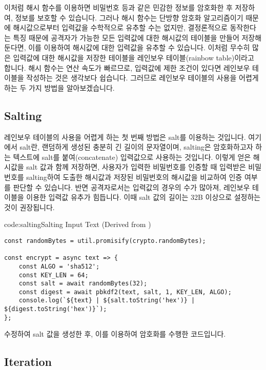 이처럼 해시 함수를 이용하면 비밀번호 등과 같은 민감한 정보를 암호화한 후 저장하여, 정보를 보호할 수 있습니다. 그러나 해시 함수는 단방향 암호화 알고리즘이기 때문에 해시값으로부터 입력값을 수학적으로 유추할 수는 없지만, 결정론적으로 동작한다는 특징 때문에 공격자가 가능한 모든 입력값에 대한 해시값의 테이블을 만들어 저장해둔다면, 이를 이용하여 해시값에 대한 입력값을 유추할 수 있습니다. 이처럼 무수히 많은 입력값에 대한 해시값을 저장한 테이블을 레인보우 테이블(rainbow table)이라고 합니다. 해시 함수는 연산 속도가 빠르므로, 입력값에 제한 조건이 있다면 레인보우 테이블을 작성하는 것은 생각보다 쉽습니다. 그러므로 레인보우 테이블의 사용을 어렵게 하는 두 가지 방법을 알아보겠습니다.

\subsection*{Salting}

레인보우 테이블의 사용을 어렵게 하는 첫 번째 방법은 salt를 이용하는 것입니다. 여기에서 salt란, 랜덤하게 생성된 충분히 긴 길이의 문자열이며, salting은 암호화하고자 하는 텍스트에 salt를 붙여(concatenate) 입력값으로 사용하는 것입니다. 이렇게 얻은 해시값을 salt 값과 함께 저장하면, 사용자가 입력한 비밀번호를 인증할 때 입력받은 비밀번호를 salting하여 도출한 해시값과 저장된 비밀번호의 해시값을 비교하여 인증 여부를 판단할 수 있습니다. 반면 공격자로서는 입력값의 경우의 수가 많아져, 레인보우 테이블을 이용한 입력값 유추가 힘듭니다. 이때 salt 값의 길이는 32B 이상으로 설정하는 것이 권장됩니다.

\begin{codeenv}{code:salting}{Salting Input Text (Derived from )}\begin{verbatim}
const randomBytes = util.promisify(crypto.randomBytes);

const encrypt = async text => {
    const ALGO = 'sha512';
    const KEY_LEN = 64;
    const salt = await randomBytes(32);
    const digest = await pbkdf2(text, salt, 1, KEY_LEN, ALGO);
    console.log(`${text} | ${salt.toString('hex')} | ${digest.toString('hex')}`);
};
\end{verbatim}
\end{codeenv}

\은 \을 수정하여 salt 값을 생성한 후, 이를 이용하여 암호화를 수행한 코드입니다.

\subsection*{Iteration}

